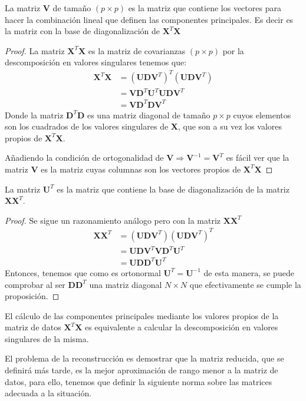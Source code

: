 \noindent 
\begin{propo}
La matriz $\mathbf{V}$ de tamaño $(p\times p)$ es la matriz que contiene los vectores para hacer la combinación lineal que definen las componentes principales. Es decir es la matriz con la base de diagonalización de $\mathbf{X}^T\mathbf{X}$
\begin{proof}
La matriz $\textbf{X}^T \textbf{X}$ es la matriz de covarianzas $(p \times p)$  por la descomposición en valores singulares tenemos que:
\begin{align*}
\textbf{X}^T \textbf{X} &= (\textbf{U}\mathbf{D} \textbf{V}^T)^T (\textbf{U}\mathbf{D} \textbf{V}^T)\\
&= \textbf{V}\mathbf{D} ^T \textbf{U}^T \textbf{U}\mathbf{D} \textbf{V}^T\\
&= \textbf{V}\mathbf{D} ^T \mathbf{D} \textbf{V}^T
\end{align*}
Donde la matriz $\mathbf{D} ^T \mathbf{D} $ es una matriz diagonal de tamaño $p \times p $ cuyos elementos son los cuadrados de los valores singulares de \textbf{X}, que son a su vez los valores propios de $\textbf{X}^T \textbf{X}$. 

\noindent Añadiendo la condición de ortogonalidad de $\textbf{V}\Rightarrow \textbf{V}^{-1}=\mathbf{V}^T$ es fácil ver que la matriz \textbf{V} es la matriz cuyas columnas son los vectores propios de $\textbf{X}^T\textbf{X}$
\end{proof}
\end{propo}

\begin{propo}
La matriz $\mathbf{U}^T$ es la matriz que contiene la base de diagonalización de la matriz $\mathbf{XX}^T$.  
\begin{proof}
Se sigue un razonamiento análogo pero con la matriz $\mathbf{XX}^T$
\begin{align*}
\textbf{X} \textbf{X}^T  &= (\textbf{U}\mathbf{D} \textbf{V}^T)(\textbf{U}\mathbf{D} \textbf{V}^T)^T\\
&= \mathbf{UDV}^T\mathbf{VD}^T\mathbf{U}^T\\
&= \mathbf{UDD}^T\mathbf{U}^T
\end{align*}
Entonces, tenemos que como es ortonormal $\mathbf{U}^T=\mathbf{U}^{-1}$ de esta manera, se puede comprobar al ser $\mathbf{DD}^T$ una matriz diagonal $N\times N$ que efectivamente se cumple la proposición.\qedhere
\end{proof}
\end{propo}

\begin{coro}
El cálculo de las componentes principales mediante los valores propios de la matriz de datos $\mathbf{X}^T\mathbf{X}$ es equivalente a calcular la descomposición en valores singulares de la misma. 
\end{coro}
\noindent El problema de la reconstrucción es demostrar que la matriz reducida, que se definirá más tarde, es la mejor aproximación de rango menor a la matriz de datos, para ello, tenemos que definir la siguiente norma sobre las matrices adecuada a la situación. 

